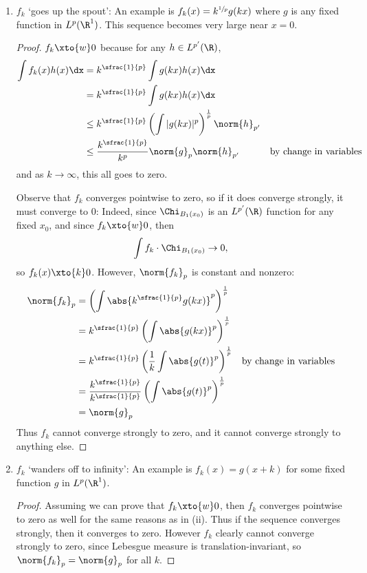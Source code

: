\documentclass[12pt,letterpaper]{article}
\begin{document}
\begin{enumerate}
\begin{enumerate}
\begin{proof}
Finally, note that if we fix $x$ and let $k\to\infty$, then $\sin(x)$ takes values all over $[0,1]$, so it doesn't converge pointwise. Therefore, $f_k$ doesn't converge strongly to anything. \qedwhitehere
\end{proof}
	\item $f_k$ `goes up the spout': An example is $f_k(x) = k^{\sfrac{1}{p}}	g(kx)$ where $g$ is any fixed function in $L^p(\R^1)$. This sequence becomes very large near $x = 0$.
	\begin{proof}
	$f_k\xto{w}0$ because for any $h\in L^{p'}(\R)$, 
	\begin{align*}
	\int f_k(x)h(x)\dx&=k^{\sfrac{1}{p}}\int g(kx)h(x)\dx\\	
	&=k^{\sfrac{1}{p}}\int g(kx)h(x)\dx\\	
	&\leq k^{\sfrac{1}{p}} \left(\int |g(kx)|^p\right)^{\frac{1}{p}} \norm{h}_{p'} \\
	&\leq \frac{k^{\sfrac{1}{p}}}{k^p} \norm{g}_p \norm{h}_{p'} &\text{by change in variables}\\
	\end{align*}
	and as $k\to\infty$, this all goes to zero. 
	
	Observe that $f_k$ converges pointwise to zero, so if it does converge strongly, it must converge to 0: Indeed, since $\Chi_{B_1(x_0)}$ is an $L^{p'}(\R)$ function for any fixed $x_0$, and since $f_k\xto{w}0$, then 
	$$\int f_k\cdot \Chi_{B_1(x_0)}\to 0,$$
	so $f_k(x)\xto{k}0$. 	However, $\norm{f_k}_p$ is constant and nonzero:
	\begin{align*}
	\norm{f_k}_p &= \left(\int \abs{k^{\sfrac{1}{p}}g(kx)}^p\right)^{\frac{1}{p}} \\
	&= k^{\sfrac{1}{p}}\left(\int \abs{g(kx)}^p\right)^{\frac{1}{p}} \\
	&= k^{\sfrac{1}{p}}\left(\frac{1}{k}\int \abs{g(t)}^p\right)^{\frac{1}{p}}&\text{by change in variables} \\
	&= \frac{k^{\sfrac{1}{p}}}{k^{\sfrac{1}{p}}}\left(\int \abs{g(t)}^p\right)^{\frac{1}{p}}\\
	&= \norm{g}_p
	\end{align*}
	Thus $f_k$ cannot converge strongly to zero, and it cannot converge strongly to anything else. \qedwhitehere
	\end{proof}
	
	\pagebreak
	\item $f_k$ `wanders off to infinity': An example is $f_k(x) = g(x + k)$ for some fixed function $g$ in $L^p(\R^1)$.
	\begin{proof}
	Assuming we can prove that $f_k\xto{w}0$, then $f_k$ converges pointwise to zero as well for the same reasons as in (ii). Thus if the sequence converges strongly, then it converges to zero. However $f_k$ clearly cannot converge strongly to zero, since Lebesgue measure is translation-invariant, so $\norm{f_k}_p=\norm{g}_p$ for all $k$. 
	

\end{proof}
\end{enumerate}
\end{enumerate}
\end{document}
